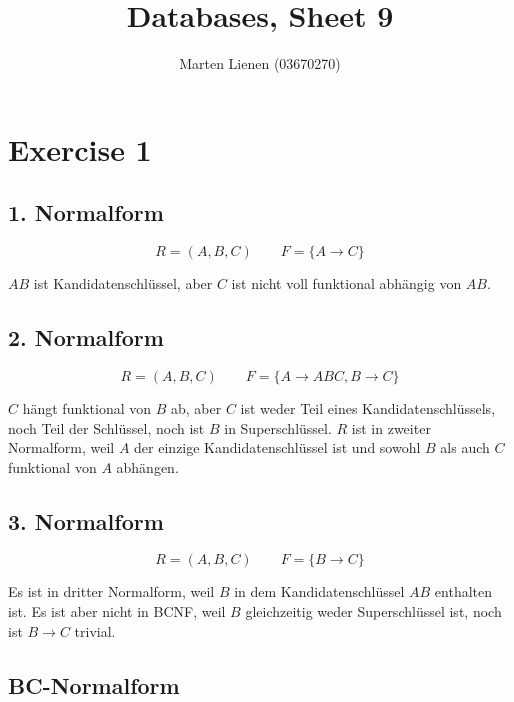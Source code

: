 \documentclass[10pt,a4paper]{article}
\title{Databases, Sheet 9}
\author{Marten Lienen (03670270)}
\begin{document}
\maketitle

\section*{Exercise 1}

\subsection*{1. Normalform}

\begin{equation*}
  R = (A, B, C) \qquad F = \{ A \rightarrow C \}
\end{equation*}

$AB$ ist Kandidatenschlüssel, aber $C$ ist nicht voll funktional abhängig von $AB$.

\subsection*{2. Normalform}

\begin{equation*}
  R = (A, B, C) \qquad F = \{ A \rightarrow ABC, B \rightarrow C \}
\end{equation*}

$C$ hängt funktional von $B$ ab, aber $C$ ist weder Teil eines Kandidatenschlüssels, noch Teil der Schlüssel, noch ist $B$ in Superschlüssel.
$R$ ist in zweiter Normalform, weil $A$ der einzige Kandidatenschlüssel ist und sowohl $B$ als auch $C$ funktional von $A$ abhängen.

\subsection*{3. Normalform}

\begin{equation*}
  R = (A, B, C) \qquad F = \{ B \rightarrow C \}
\end{equation*}

Es ist in dritter Normalform, weil $B$ in dem Kandidatenschlüssel $AB$ enthalten ist.
Es ist aber nicht in BCNF, weil $B$ gleichzeitig weder Superschlüssel ist, noch ist $B \rightarrow C$ trivial.

\subsection*{BC-Normalform}
\end{document}
